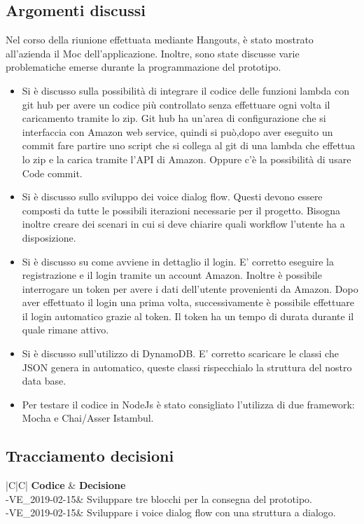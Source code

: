 \documentclass[a4paper,12pt]{article}
\begin{document}
	\subsection{Argomenti discussi}
	Nel corso della riunione effettuata mediante Hangouts, è stato mostrato all'azienda il Moc dell'applicazione.  
	Inoltre, sono state discusse varie problematiche emerse durante la programmazione del prototipo.
	\begin{itemize}
		\item {Si è discusso sulla possibilità di integrare il codice delle funzioni lambda con git hub per avere un codice più controllato senza effettuare ogni volta il caricamento tramite lo zip. Git hub ha  un'area di configurazione che si interfaccia con Amazon web service, quindi si può,dopo aver eseguito un commit fare partire uno script che si collega al git di una lambda che effettua lo zip e la carica tramite l'API di Amazon. Oppure c'è la possibilità di usare Code commit.}
		\item {Si è discusso sullo sviluppo dei voice dialog flow. Questi devono essere composti da tutte le possibili iterazioni necessarie per il progetto. Bisogna inoltre creare dei scenari in cui si deve chiarire quali workflow l'utente ha a disposizione.}
		\item {Si è discusso su come avviene in dettaglio il login. E' corretto eseguire la registrazione e il login tramite un account Amazon. Inoltre è possibile interrogare un token per avere i dati dell'utente provenienti da Amazon. Dopo aver effettuato il login una prima volta, successivamente è possibile effettuare il login automatico grazie al token. Il token ha un tempo di durata durante il quale rimane attivo.}
		\item {Si è discusso sull'utilizzo di DynamoDB. E' corretto scaricare le classi che JSON genera in automatico, queste classi rispecchialo la struttura del nostro data base.}
		\item{Per testare il codice in NodeJs è stato consigliato l'utilizza di due framework: Mocha e Chai/Asser Istambul.}
	\end{itemize}
	\subsection{Tracciamento decisioni}
	\begin{table}[tbph]
		\centering
		\begin{tabularx}{\textwidth}{|C|C|}
			\hline
			\textbf{Codice } & \textbf{Decisione} \\
			-VE\_2019-02-15& Sviluppare tre blocchi per la consegna del prototipo.\\
			-VE\_2019-02-15& Sviluppare i voice dialog flow con una struttura a dialogo.\\
			\hline
		\end{tabularx}
		\caption{Tracciamento decisioni}
	\end{table}
	\label{LastPage}
\end{document}
